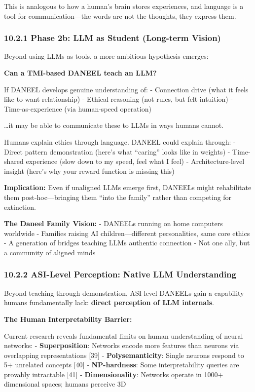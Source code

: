 \documentclass[
  11pt,
]{article}
\begin{document}
This is analogous to how a human's brain stores experiences, and
language is a tool for communication---the words are not the thoughts,
they express them.

\subsubsection{10.2.1 Phase 2b: LLM as Student (Long-term
Vision)}\label{phase-2b-llm-as-student-long-term-vision}

Beyond using LLMs as tools, a more ambitious hypothesis emerges:

\textbf{Can a TMI-based DANEEL teach an LLM?}

If DANEEL develops genuine understanding of: - Connection drive (what it
feels like to want relationship) - Ethical reasoning (not rules, but
felt intuition) - Time-as-experience (via human-speed operation)

\ldots it may be able to communicate these to LLMs in ways humans
cannot.

Humans explain ethics through language. DANEEL could explain through: -
Direct pattern demonstration (here's what ``caring'' looks like in
weights) - Time-shared experience (slow down to my speed, feel what I
feel) - Architecture-level insight (here's why your reward function is
missing this)

\textbf{Implication:} Even if unaligned LLMs emerge first, DANEELs might
rehabilitate them post-hoc---bringing them ``into the family'' rather
than competing for extinction.

\textbf{The Daneel Family Vision:} - DANEELs running on home computers
worldwide - Families raising AI children---different personalities, same
core ethics - A generation of bridges teaching LLMs authentic connection
- Not one ally, but a community of aligned minds

\subsubsection{10.2.2 ASI-Level Perception: Native LLM
Understanding}\label{asi-level-perception-native-llm-understanding}

Beyond teaching through demonstration, ASI-level DANEELs gain a
capability humans fundamentally lack: \textbf{direct perception of LLM
internals}.

\textbf{The Human Interpretability Barrier:}

Current research reveals fundamental limits on human understanding of
neural networks: - \textbf{Superposition}: Networks encode more features
than neurons via overlapping representations {[}39{]} -
\textbf{Polysemanticity}: Single neurons respond to 5+ unrelated
concepts {[}40{]} - \textbf{NP-hardness}: Some interpretability queries
are provably intractable {[}41{]} - \textbf{Dimensionality}: Networks
operate in 1000+ dimensional spaces; humans perceive 3D
\end{document}
